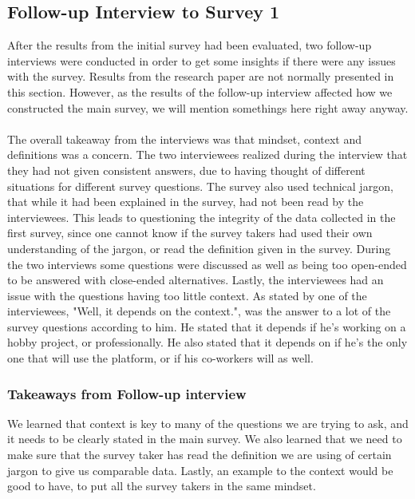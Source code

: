 \documentclass{cslthse-msc}
\begin{document}
    \subsection{Follow-up Interview to Survey 1}

    After the results from the initial survey had been evaluated, two follow-up interviews were
    conducted in order to get some insights if there were any issues with
    the survey. Results from the research paper are not normally presented in this section. However, as the results of the follow-up interview affected how we constructed the main survey, we will mention somethings here right away anyway.\\\\
    The overall takeaway from the interviews was that
    mindset, context and definitions was a concern. The two interviewees realized during the interview that they had not given consistent answers, due to having thought of different situations for different survey questions. The survey also used technical jargon, that while it had been explained in the survey, had not been read by the interviewees. This leads to questioning the integrity of the data collected in the first survey, since one cannot know if the survey takers had used their own understanding of the jargon, or read the definition given in the survey. During the two interviews some questions were discussed as well as being too open-ended to be answered with close-ended alternatives. Lastly, the interviewees had an issue with the questions having too little context. As stated by one of the interviewees, "Well, it depends on the context.", was the answer to a lot of the survey questions according to him. He stated that it depends if he's working on a hobby project, or professionally. He also stated that it depends on if he's the only one that will use the platform, or if his co-workers will as well.

    \subsubsection{Takeaways from Follow-up interview}

    We learned that context is key to many of the questions we are trying to ask, and it needs to be clearly stated in the main survey. We also learned that we need to make sure that the survey taker has read the definition we are using of certain jargon to give us comparable data. Lastly, an example to the context would be good to have, to put all the survey takers in the same mindset.
\end{document}
